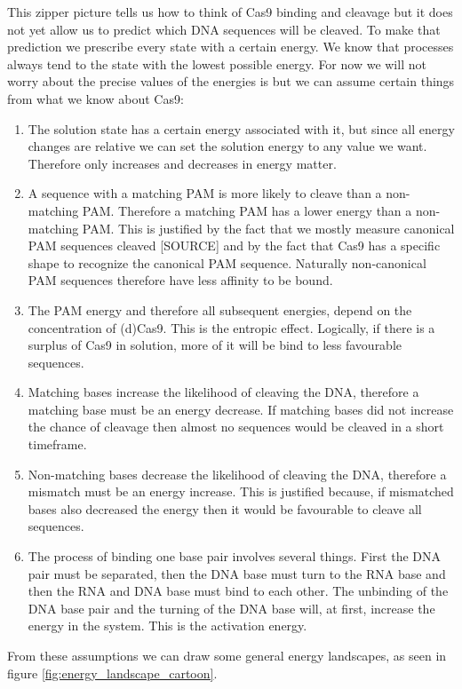 This zipper picture tells us how to think of Cas9 binding and cleavage but it does not yet allow us to predict which DNA sequences will be cleaved. To make that prediction we prescribe every state with a certain energy. We know that processes always tend to the state with the lowest possible energy. For now we will not worry about the precise values of the energies is but we can assume certain things from what we know about Cas9:

\begin{enumerate}
\item The solution state has a certain energy associated with it, but since all energy changes are relative we can set the solution energy to any value we want. Therefore only increases and decreases in energy matter.
\item A sequence with a matching PAM is more likely to cleave than a non-matching PAM. Therefore a matching PAM has a lower energy than a non-matching PAM. This is justified by the fact that we mostly measure canonical PAM sequences cleaved [SOURCE] and by the fact that Cas9 has a specific shape to recognize the canonical PAM sequence. Naturally non-canonical PAM sequences therefore have less affinity to be bound.
\item The PAM energy and therefore all subsequent energies, depend on the concentration of (d)Cas9. This is the entropic effect. Logically, if there is a surplus of Cas9 in solution, more of it will be bind to less favourable sequences.
\item Matching bases increase the likelihood of cleaving the DNA, therefore a matching base must be an energy decrease. If matching bases did not increase the chance of cleavage then almost no sequences would be cleaved in a short timeframe.
\item Non-matching bases decrease the likelihood of cleaving the DNA, therefore a mismatch must be an energy increase. This is justified because, if mismatched bases also decreased the energy then it would be favourable to cleave all sequences.
\item The process of binding one base pair involves several things. First the DNA pair must be separated, then the DNA base must turn to the RNA base and then the RNA and DNA base must bind to each other. The unbinding of the DNA base pair and the turning of the DNA base will, at first, increase the energy in the system. This is the activation energy.
\end{enumerate}

From these assumptions we can draw some general energy landscapes, as seen in figure \ref{fig:energy_landscape_cartoon}.

